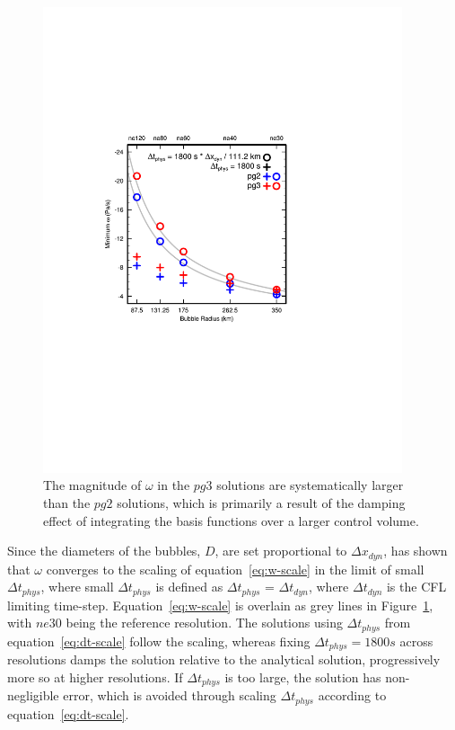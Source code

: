 \documentclass{agujournal}
\begin{document}
\begin{figure}[t]
\begin{center}
\noindent\includegraphics[width=25pc,angle=0]{figs/bubble_test.pdf}\\
\caption{The magnitude of $\omega$ in the $pg3$ solutions are systematically larger than the $pg2$ solutions, which is primarily a result of the damping effect of integrating the basis functions over a larger control volume.}
\end{center}
\caption{}
\label{fig:bubble}
\end{figure}

Since the diameters of the bubbles, $D$, are set proportional to $\Delta x_{dyn}$, \cite{HR2018JAMES} has shown that $\omega$ converges to the scaling of equation~\ref{eq:w-scale} in the limit of small $\Delta t_{phys}$, where small $\Delta t_{phys}$ is defined as $\Delta t_{phys}$ = $\Delta t_{dyn}$, where $\Delta t_{dyn}$ is the CFL limiting time-step. Equation~\ref{eq:w-scale} is overlain as grey lines in Figure~\ref{fig:bubble}, with $ne30$ being the reference resolution. The solutions using $\Delta t_{phys}$ from equation~\ref{eq:dt-scale} follow the scaling, whereas fixing $\Delta t_{phys} = 1800s$ across resolutions damps the solution relative to the analytical solution, progressively more so at higher resolutions. If $\Delta t_{phys}$ is too large, the solution has non-negligible error, which is avoided through scaling $\Delta t_{phys}$ according to equation~\ref{eq:dt-scale}.
\end{document}
